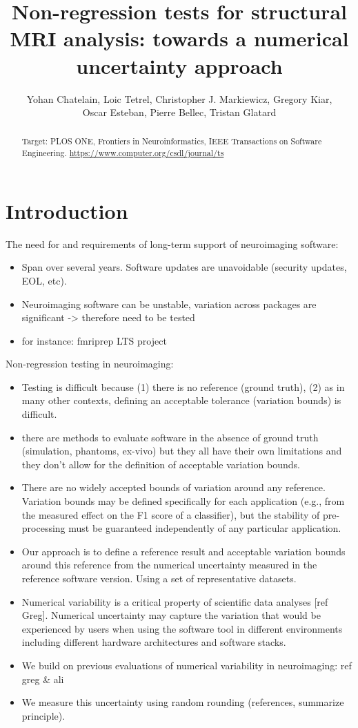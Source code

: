 \documentclass{article}
\title{Non-regression tests for structural MRI analysis: towards a numerical uncertainty approach}
\author{Yohan Chatelain, Loic Tetrel, Christopher J. Markiewicz, Gregory Kiar,\\ Oscar Esteban,  Pierre Bellec, Tristan Glatard}
\begin{document}
\maketitle

\begin{abstract}
    Target: PLOS ONE, Frontiers in Neuroinformatics,  IEEE Transactions on Software Engineering. \url{https://www.computer.org/csdl/journal/ts}
\end{abstract}

\section{Introduction}

    The need for and requirements of long-term support of neuroimaging software: 
    \begin{itemize}
        \item Span over several years. Software updates are unavoidable (security updates, EOL, etc). 
        \item Neuroimaging software can be unstable, variation across packages are significant -> therefore need to be tested
        \item for instance: fmriprep LTS project
    \end{itemize}
    
    Non-regression testing in neuroimaging:
    \begin{itemize}
        \item Testing is difficult because (1) there is no reference (ground truth), (2) as in many other contexts, defining an acceptable tolerance (variation bounds) is difficult.
        \item there are methods to evaluate software in the absence of ground truth (simulation, phantoms, ex-vivo) but they all have their own limitations and they don't allow for the definition of acceptable variation bounds.
        \item There are no widely accepted bounds of variation around any reference. Variation bounds may be defined specifically for each application (e.g., from the measured effect on the F1 score of a classifier), but the stability of pre-processing must be guaranteed independently of any particular application.
        \item Our approach is to define a reference result and acceptable variation bounds around this reference from the numerical uncertainty measured in the reference software version. Using a set of representative datasets.
        \item Numerical variability is a critical property of scientific data analyses [ref Greg]. Numerical uncertainty may capture the variation that would be experienced by users when using the software tool in different environments including different hardware architectures and software stacks.
        \item We build on previous evaluations of numerical variability in neuroimaging: ref greg \& ali
        \item We measure this uncertainty using random rounding (references, summarize principle).
    \end{itemize}
\end{document}
